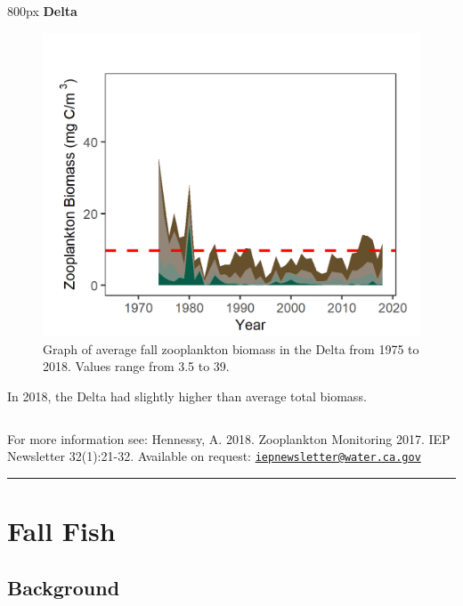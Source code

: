 \documentclass[
]{book}
\begin{document}
\begin{column}{800px\textwidth}
\textbf{Delta}

\begin{figure}
\includegraphics[width=15.25in]{figures/zoops_dtfall} \caption{Graph of average fall zooplankton biomass in the Delta from 1975 to 2018. Values range from 3.5 to 39.}\label{fig:unnamed-chunk-117}
\end{figure}

In 2018, the Delta had slightly higher than average total biomass.
\end{column}

\begin{disclaimer}
For more information see: Hennessy, A. 2018. Zooplankton Monitoring
2017. IEP Newsletter 32(1):21-32. Available on request:
\href{mailto:iepnewsletter@water.ca.gov}{\nolinkurl{iepnewsletter@water.ca.gov}}
\end{disclaimer}

\begin{center}\rule{0.5\linewidth}{0.5pt}\end{center}

\hypertarget{fall-fish}{%
\section{Fall Fish}\label{fall-fish}}

\hypertarget{background-16}{%
\subsection{Background}\label{background-16}}
\end{document}
